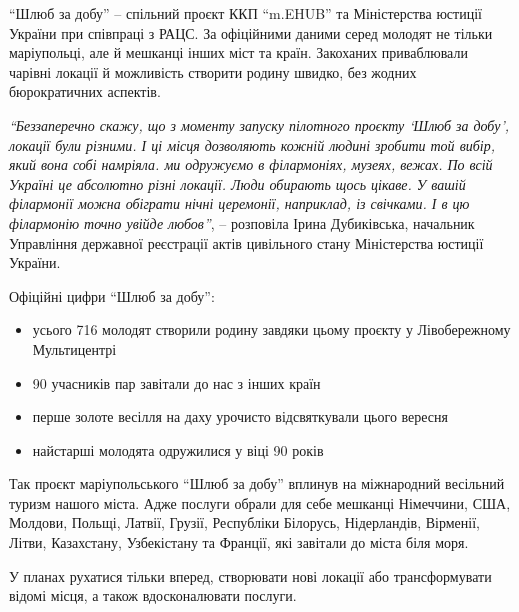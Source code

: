 \enquote{Шлюб за добу} – спільний проєкт ККП \enquote{m.EHUB} та Міністерства юстиції України
при співпраці з РАЦС. За офіційними даними серед молодят не тільки маріупольці,
але й мешканці інших міст та країн. Закоханих приваблювали чарівні локації й
можливість створити родину швидко, без жодних бюрократичних аспектів.


\emph{\enquote{Беззаперечно скажу, що з моменту запуску пілотного проєкту \enquote{Шлюб за добу},
локації були різними. І ці місця дозволяють кожній людині зробити той вибір,
який вона собі намріяла. ми одружуємо в філармоніях, музеях, вежах. По всій
Україні це абсолютно різні локації. Люди обирають щось цікаве. У вашій
філармонії можна обіграти нічні церемонії, наприклад, із свічками. І в цю
філармонію точно увійде любов}}, – розповіла Ірина Дубиківська, начальник
Управління державної реєстрації актів цивільного стану Міністерства юстиції
України.



Офіційні цифри \enquote{Шлюб за добу}: 

\begin{itemize}
  \item усього 716 молодят створили родину завдяки цьому проєкту у Лівобережному Мультицентрі
  \item 90 учасників пар завітали до нас з інших країн
  \item перше золоте весілля на даху урочисто відсвяткували цього вересня
  \item найстарші молодята одружилися у віці 90 років
\end{itemize}


Так проєкт маріупольського \enquote{Шлюб за добу} вплинув на міжнародний
весільний туризм нашого міста. Адже послуги обрали для себе мешканці Німеччини,
США, Молдови, Польщі, Латвії, Грузії, Республіки Білорусь, Нідерландів,
Вірменії, Літви, Казахстану, Узбекістану та Франції, які завітали до міста біля
моря.


У планах рухатися тільки вперед, створювати нові локації або трансформувати
відомі місця, а також вдосконалювати послуги.

